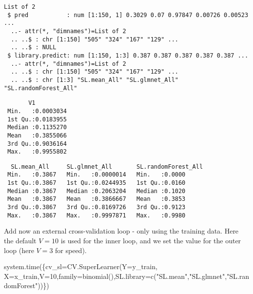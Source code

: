 \documentclass[
  letterpaper,
  DIV=11,
  numbers=noendperiod]{scrartcl}
\newenvironment{Shaded}{\begin{snugshade}}{\end{snugshade}}
\newcommand{\AttributeTok}[1]{\textcolor[rgb]{0.40,0.45,0.13}{#1}}
\newcommand{\DecValTok}[1]{\textcolor[rgb]{0.68,0.00,0.00}{#1}}
\newcommand{\FunctionTok}[1]{\textcolor[rgb]{0.28,0.35,0.67}{#1}}
\newcommand{\NormalTok}[1]{\textcolor[rgb]{0.00,0.23,0.31}{#1}}
\newcommand{\OtherTok}[1]{\textcolor[rgb]{0.00,0.23,0.31}{#1}}
\newcommand{\SpecialCharTok}[1]{\textcolor[rgb]{0.37,0.37,0.37}{#1}}
\newcommand{\StringTok}[1]{\textcolor[rgb]{0.13,0.47,0.30}{#1}}
\begin{document}
\begin{verbatim}
List of 2
 $ pred           : num [1:150, 1] 0.3029 0.07 0.97847 0.00726 0.00523 ...
  ..- attr(*, "dimnames")=List of 2
  .. ..$ : chr [1:150] "505" "324" "167" "129" ...
  .. ..$ : NULL
 $ library.predict: num [1:150, 1:3] 0.387 0.387 0.387 0.387 0.387 ...
  ..- attr(*, "dimnames")=List of 2
  .. ..$ : chr [1:150] "505" "324" "167" "129" ...
  .. ..$ : chr [1:3] "SL.mean_All" "SL.glmnet_All" "SL.randomForest_All"
\end{verbatim}

\begin{Shaded}
\end{Shaded}

\begin{verbatim}
       V1           
 Min.   :0.0003034  
 1st Qu.:0.0183955  
 Median :0.1135270  
 Mean   :0.3855066  
 3rd Qu.:0.9036164  
 Max.   :0.9955802  
\end{verbatim}

\begin{Shaded}
\end{Shaded}

\begin{verbatim}
  SL.mean_All     SL.glmnet_All       SL.randomForest_All
 Min.   :0.3867   Min.   :0.0000014   Min.   :0.0000     
 1st Qu.:0.3867   1st Qu.:0.0244935   1st Qu.:0.0160     
 Median :0.3867   Median :0.2063204   Median :0.1020     
 Mean   :0.3867   Mean   :0.3866667   Mean   :0.3853     
 3rd Qu.:0.3867   3rd Qu.:0.8169726   3rd Qu.:0.9123     
 Max.   :0.3867   Max.   :0.9997871   Max.   :0.9980     
\end{verbatim}

Add now an external cross-validation loop - only using the training
data. Here the default \(V=10\) is used for the inner loop, and we set
the value for the outer loop (here \(V=3\) for speed).

\begin{Shaded}
\begin{Highlighting}[]
\FunctionTok{system.time}\NormalTok{(\{cv\_sl}\OtherTok{=}\FunctionTok{CV.SuperLearner}\NormalTok{(}\AttributeTok{Y=}\NormalTok{y\_train, }\AttributeTok{X=}\NormalTok{x\_train,}\AttributeTok{V=}\DecValTok{10}\NormalTok{,}\AttributeTok{family=}\FunctionTok{binomial}\NormalTok{(),}\AttributeTok{SL.library=}\FunctionTok{c}\NormalTok{(}\StringTok{"SL.mean"}\NormalTok{,}\StringTok{"SL.glmnet"}\NormalTok{,}\StringTok{"SL.randomForest"}\NormalTok{))\})}
\end{Highlighting}
\end{Shaded}
\end{document}

